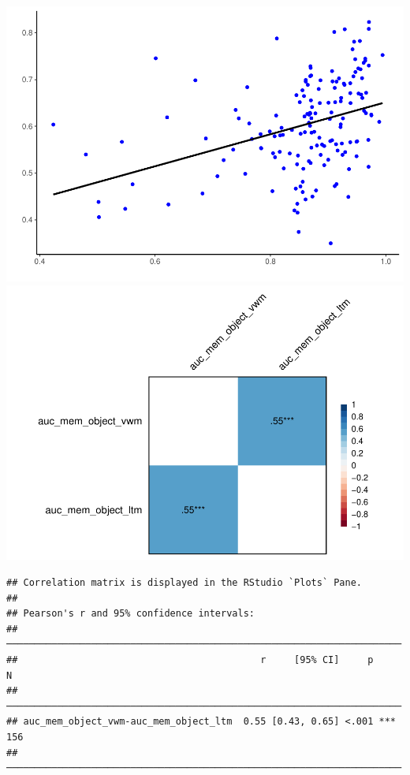 \documentclass[
  man]{apa6}
\begin{document}
\includegraphics{Script_Re_Greer_2023_group1Rock_2023_files/figure-latex/unnamed-chunk-6-1.pdf}
\includegraphics{Script_Re_Greer_2023_group1Rock_2023_files/figure-latex/unnamed-chunk-7-1.pdf}

\begin{verbatim}
## Correlation matrix is displayed in the RStudio `Plots` Pane.
## 
## Pearson's r and 95% confidence intervals:
## ──────────────────────────────────────────────────────────────────────
##                                           r     [95% CI]     p       N
## ──────────────────────────────────────────────────────────────────────
## auc_mem_object_vwm-auc_mem_object_ltm  0.55 [0.43, 0.65] <.001 *** 156
## ──────────────────────────────────────────────────────────────────────
\end{verbatim}
\end{document}
